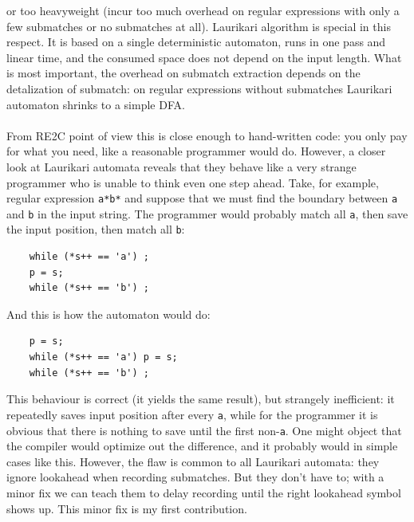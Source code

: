 \documentclass{article}
\theoremstyle{definition}
\begin{document}
\begin{multicols}{2}
or too heavyweight (incur too much overhead on regular expressions with only a few submatches or no submatches at all).
Laurikari algorithm is special in this respect.
It is based on a single deterministic automaton, runs in one pass and linear time,
and the consumed space does not depend on the input length.
What is most important, the overhead on submatch extraction depends on the detalization of submatch:
on regular expressions without submatches Laurikari automaton shrinks to a simple DFA.
\\ \\
From RE2C point of view this is close enough to hand-written code:
you only pay for what you need, like a reasonable programmer would do.
However, a closer look at Laurikari automata reveals that
they behave like a very strange programmer who is unable to think even one step ahead.
Take, for example, regular expression \texttt{a*b*}
and suppose that we must find the boundary between \texttt{a} and \texttt{b} in the input string.
The programmer would probably match all \texttt{a}, then save the input position, then match all \texttt{b}:

\begin{small}
\begin{verbatim}
    while (*s++ == 'a') ;
    p = s;
    while (*s++ == 'b') ;
\end{verbatim}
\end{small}

And this is how the automaton would do:

\begin{small}
\begin{verbatim}
    p = s;
    while (*s++ == 'a') p = s;
    while (*s++ == 'b') ;
\end{verbatim}
\end{small}

This behaviour is correct (it yields the same result), but strangely inefficient:
it repeatedly saves input position after every \texttt{a},
while for the programmer it is obvious that there is nothing to save until the first non-\texttt{a}.
One might object that the compiler would optimize out the difference,
and it probably would in simple cases like this.
However, the flaw is common to all Laurikari automata:
they ignore lookahead when recording submatches.
But they don't have to; with a minor fix we can teach them
to delay recording until the right lookahead symbol shows up.
This minor fix is my first contribution.
\\


\end{multicols}
\end{document}
